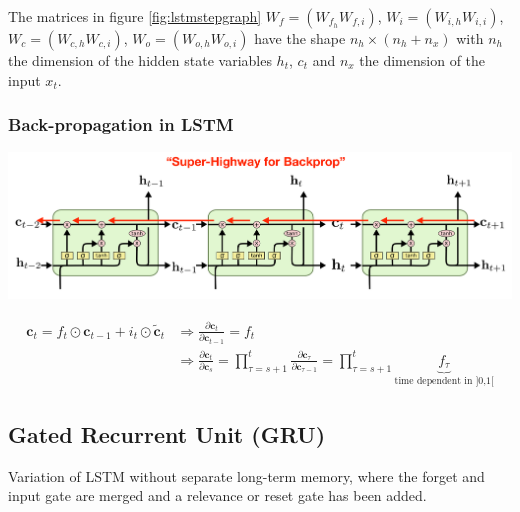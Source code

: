 \documentclass[11pt]{article}
\begin{document}
The matrices in figure \ref{fig:lstmstepgraph} $W_f = (W_{f_h}W_{f,i})$, $W_i = (W_{i,h}W_{i,i})$, $W_c = (W_{c,h}W_{c,i})$, $W_o = (W_{o,h}W_{o,i})$ have the shape $n_h\times(n_h + n_x)$ with $n_h$ the dimension of the hidden state variables $h_t$, $c_t$ and $n_x$ the dimension of the input $x_t$.

\subsubsection{Back-propagation in LSTM}
\begin{center}
	\includegraphics[width=0.8\linewidth]{img/LSTM_backprop}
\end{center}

\begin{align*}
	\textbf{c}_t = f_t \odot \textbf{c}_{t-1} + i_t \odot \tilde{\textbf{c}}_t &\Rightarrow \frac{\partial \textbf{c}_t}{\partial \textbf{c}_{t-1}} = f_t\\
	&\Rightarrow \frac{\partial \textbf{c}_t}{\partial \textbf{c}_{s}} = \prod_{\tau=s+1}^{t}\frac{\partial \textbf{c}_\tau}{\partial \textbf{c}_{\tau-1}} = \prod_{\tau=s+1}^{t} \underbrace{f_\tau}_{\text{time dependent in ]0,1[}}
\end{align*}

\subsection{Gated Recurrent Unit (GRU)}
Variation of LSTM without separate long-term memory, where the forget and input gate are merged and a relevance or reset gate has been added.
\end{document}
